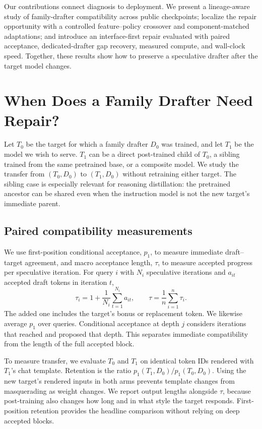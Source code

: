 \documentclass[11pt]{article}
\begin{document}
Our contributions connect diagnosis to deployment. We present a lineage-aware study of family-drafter compatibility across public checkpoints; localize the repair opportunity with a controlled feature--policy crossover and component-matched adaptations; and introduce an interface-first repair evaluated with paired acceptance, dedicated-drafter gap recovery, measured compute, and wall-clock speed. Together, these results show how to preserve a speculative drafter after the target model changes.



\section{When Does a Family Drafter Need Repair?}
\label{sec:study}
Let $T_0$ be the target for which a family drafter $D_0$ was trained, and let $T_1$ be the model we wish to serve. $T_1$ can be a direct post-trained child of $T_0$, a sibling trained from the same pretrained base, or a composite model. We study the transfer from $(T_0,D_0)$ to $(T_1,D_0)$ without retraining either target. The sibling case is especially relevant for reasoning distillation: the pretrained ancestor can be shared even when the instruction model is not the new target's immediate parent.

\subsection{Paired compatibility measurements}
We use first-position conditional acceptance, $p_1$, to measure immediate draft--target agreement, and macro acceptance length, $\tau$, to measure accepted progress per speculative iteration. For query $i$ with $N_i$ speculative iterations and $a_{it}$ accepted draft tokens in iteration $t$,
\begin{equation}
\tau_i = 1 + \frac{1}{N_i}\sum_{t=1}^{N_i} a_{it},
\qquad \tau=\frac{1}{n}\sum_{i=1}^{n}\tau_i.
\label{eq:tau}
\end{equation}
The added one includes the target's bonus or replacement token. We likewise average $p_1$ over queries. Conditional acceptance at depth $j$ considers iterations that reached and proposed that depth. This separates immediate compatibility from the length of the full accepted block.

To measure transfer, we evaluate $T_0$ and $T_1$ on identical token IDs rendered with $T_1$'s chat template. Retention is the ratio $p_1(T_1,D_0)/p_1(T_0,D_0)$. Using the new target's rendered inputs in both arms prevents template changes from masquerading as weight changes. We report output lengths alongside $\tau$, because post-training also changes how long and in what style the target responds. First-position retention provides the headline comparison without relying on deep accepted blocks.
\end{document}

